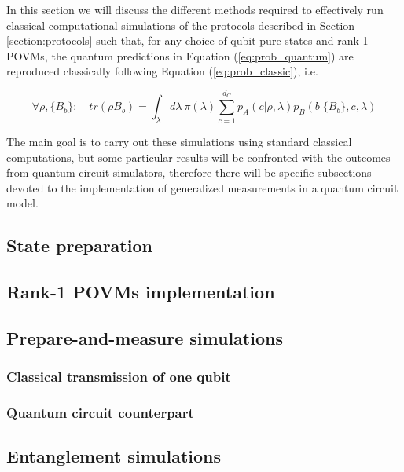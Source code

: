 In this section we will discuss the different methods required to effectively run classical computational simulations of the protocols described in Section \ref{section:protocols} such that, for any choice of qubit pure states and rank-1 POVMs, the quantum predictions in Equation (\ref{eq:prob_quantum}) are reproduced classically following Equation (\ref{eq:prob_classic}), i.e.

\begin{equation}
\forall \rho, \{B_b\}:\quad tr(\rho B_b) = \int_{\lambda} d\lambda\ \pi(\lambda) \sum_{c=1}^{d_C} p_A(c|\rho, \lambda) p_B(b|\{B_b\}, c, \lambda)    
\end{equation}

The main goal is to carry out these simulations using standard classical computations, but some particular results will be confronted with the outcomes from quantum circuit simulators, therefore there will be specific subsections devoted to the implementation of generalized measurements in a quantum circuit model. 
\subsection{State preparation}

\subsection{Rank-1 POVMs implementation}

\subsection{Prepare-and-measure simulations}
\subsubsection{Classical transmission of one qubit}

\subsubsection{Quantum circuit counterpart}

\subsection{Entanglement simulations}
